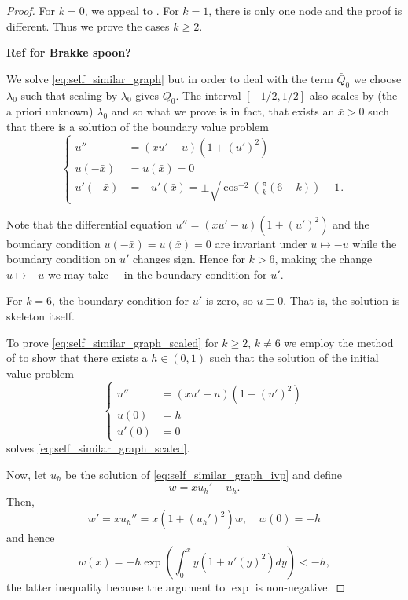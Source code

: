 \documentclass[11pt]{amsart}
\begin{document}
\begin{proof}
For \(k = 0\), we appeal to \cite{MR845704}. For \(k = 1\), there is only one node and the proof is different. Thus we prove the cases \(k \geq 2\).

\textbf{Ref for Brakke spoon?}

We solve \eqref{eq:self_similar_graph} but in order to deal with the term \(\bar{Q}_0\) we choose \(\lambda_0\) such that scaling by \(\lambda_0\) gives \(\bar{Q}_0\). The interval \([-1/2, 1/2]\) also scales by (the a priori unknown) \(\lambda_0\) and so what we prove is in fact, that exists an \(\bar{x} > 0\) such that there is a solution of the boundary value problem
\begin{equation}
\label{eq:self_similar_graph_scaled}
\begin{cases}
u'' &= (xu' - u)(1 + (u')^2) \\
u(-\bar{x}) &= u(\bar{x}) = 0 \\
u'(-\bar{x}) &= -u'(\bar{x}) = \pm \sqrt{\cos^{-2} \left(\frac{\pi}{k}(6 - k)\right) - 1}.
\end{cases}
\end{equation}

Note that the differential equation \(u'' = (xu' - u)(1 + (u')^2)\) and the boundary condition \(u(-\bar{x}) = u(\bar{x}) = 0\) are invariant under \(u \mapsto -u\) while the boundary condition on \(u'\) changes sign. Hence for \(k > 6\), making the change \(u \mapsto -u\) we may take \(+\) in the boundary condition for \(u'\).

For \(k = 6\), the boundary condition for \(u'\) is zero, so \(u \equiv 0\). That is, the solution is skeleton itself.

To prove \eqref{eq:self_similar_graph_scaled} for \(k \geq 2\), \(k \ne 6\) we employ the method of \cite[Proposition 5.1]{MR2763716} to show that there exists a \(h \in (0, 1)\) such that the solution of the initial value problem
\begin{equation}
\label{eq:self_similar_graph_ivp}
\begin{cases}
u'' &= (xu' - u)(1 + (u')^2) \\
u(0) &= h \\
u'(0) &= 0
\end{cases}
\end{equation}
solves \eqref{eq:self_similar_graph_scaled}.

Now, let \(u_h\) be the solution of \eqref{eq:self_similar_graph_ivp} and define
\[
w = x u_h' - u_h.
\]
Then,
\[
w' = x u_h'' = x (1 + (u_h')^2) w, \quad w(0) = -h
\]
and hence
\[
w(x) = -h \exp\left(\int_0^x y(1 + u'(y)^2) dy\right) < -h,
\]
the latter inequality because the argument to \(\exp\) is non-negative.


\end{proof}
\end{document}
